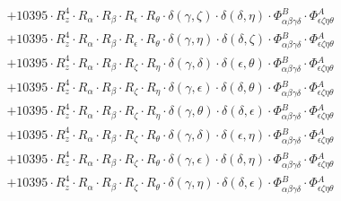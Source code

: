 \documentclass{article}
\begin{document}
\begin{equation}
\begin{array}{c}
 \\[0.2em] 		 + 10395 \cdot R_{z}^{4} \cdot R_{\alpha{}} \cdot R_{\beta{}} \cdot R_{\epsilon{}} \cdot R_{\theta{}} \cdot \delta{}\left(\gamma{}, \zeta{}\right) \cdot \delta{}\left(\delta{}, \eta{}\right) \cdot \Phi{}^{B}_{\alpha{}\beta{}\gamma{}\delta{}} \cdot \Phi{}^{A}_{\epsilon{}\zeta{}\eta{}\theta{}} 
 \\[0.2em] 		 + 10395 \cdot R_{z}^{4} \cdot R_{\alpha{}} \cdot R_{\beta{}} \cdot R_{\epsilon{}} \cdot R_{\theta{}} \cdot \delta{}\left(\gamma{}, \eta{}\right) \cdot \delta{}\left(\delta{}, \zeta{}\right) \cdot \Phi{}^{B}_{\alpha{}\beta{}\gamma{}\delta{}} \cdot \Phi{}^{A}_{\epsilon{}\zeta{}\eta{}\theta{}} 
 \\[0.2em] 		 + 10395 \cdot R_{z}^{4} \cdot R_{\alpha{}} \cdot R_{\beta{}} \cdot R_{\zeta{}} \cdot R_{\eta{}} \cdot \delta{}\left(\gamma{}, \delta{}\right) \cdot \delta{}\left(\epsilon{}, \theta{}\right) \cdot \Phi{}^{B}_{\alpha{}\beta{}\gamma{}\delta{}} \cdot \Phi{}^{A}_{\epsilon{}\zeta{}\eta{}\theta{}} 
 \\[0.2em] 		 + 10395 \cdot R_{z}^{4} \cdot R_{\alpha{}} \cdot R_{\beta{}} \cdot R_{\zeta{}} \cdot R_{\eta{}} \cdot \delta{}\left(\gamma{}, \epsilon{}\right) \cdot \delta{}\left(\delta{}, \theta{}\right) \cdot \Phi{}^{B}_{\alpha{}\beta{}\gamma{}\delta{}} \cdot \Phi{}^{A}_{\epsilon{}\zeta{}\eta{}\theta{}} 
 \\[0.2em] 		 + 10395 \cdot R_{z}^{4} \cdot R_{\alpha{}} \cdot R_{\beta{}} \cdot R_{\zeta{}} \cdot R_{\eta{}} \cdot \delta{}\left(\gamma{}, \theta{}\right) \cdot \delta{}\left(\delta{}, \epsilon{}\right) \cdot \Phi{}^{B}_{\alpha{}\beta{}\gamma{}\delta{}} \cdot \Phi{}^{A}_{\epsilon{}\zeta{}\eta{}\theta{}} 
 \\[0.2em] 		 + 10395 \cdot R_{z}^{4} \cdot R_{\alpha{}} \cdot R_{\beta{}} \cdot R_{\zeta{}} \cdot R_{\theta{}} \cdot \delta{}\left(\gamma{}, \delta{}\right) \cdot \delta{}\left(\epsilon{}, \eta{}\right) \cdot \Phi{}^{B}_{\alpha{}\beta{}\gamma{}\delta{}} \cdot \Phi{}^{A}_{\epsilon{}\zeta{}\eta{}\theta{}} 
 \\[0.2em] 		 + 10395 \cdot R_{z}^{4} \cdot R_{\alpha{}} \cdot R_{\beta{}} \cdot R_{\zeta{}} \cdot R_{\theta{}} \cdot \delta{}\left(\gamma{}, \epsilon{}\right) \cdot \delta{}\left(\delta{}, \eta{}\right) \cdot \Phi{}^{B}_{\alpha{}\beta{}\gamma{}\delta{}} \cdot \Phi{}^{A}_{\epsilon{}\zeta{}\eta{}\theta{}} 
 \\[0.2em] 		 + 10395 \cdot R_{z}^{4} \cdot R_{\alpha{}} \cdot R_{\beta{}} \cdot R_{\zeta{}} \cdot R_{\theta{}} \cdot \delta{}\left(\gamma{}, \eta{}\right) \cdot \delta{}\left(\delta{}, \epsilon{}\right) \cdot \Phi{}^{B}_{\alpha{}\beta{}\gamma{}\delta{}} \cdot \Phi{}^{A}_{\epsilon{}\zeta{}\eta{}\theta{}} 

\end{array}
\end{equation}
\end{document}
